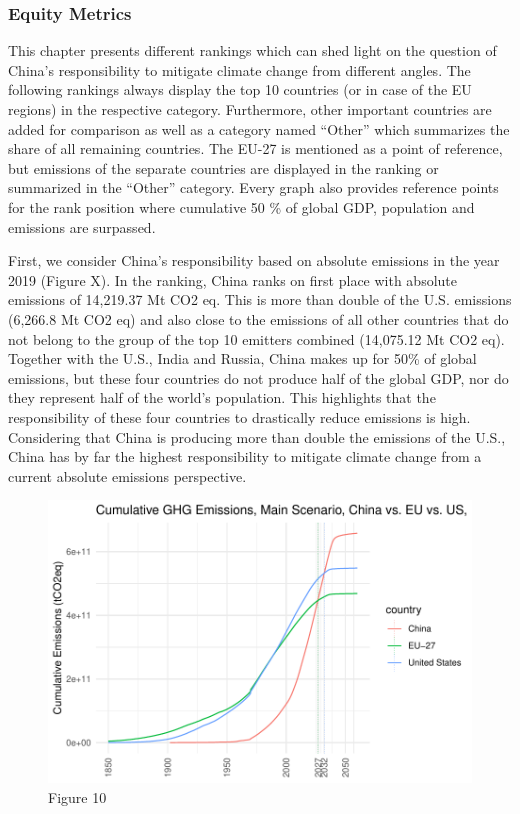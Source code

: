 \documentclass[
  12pt,
]{article}
\numberwithin{equation}{section}
\numberwithin{table}{section}
\numberwithin{figure}{section}
\begin{document}
\hypertarget{equity-metrics}{%
\subsubsection{Equity Metrics}\label{equity-metrics}}

This chapter presents different rankings which can shed light on the
question of China's responsibility to mitigate climate change from
different angles. The following rankings always display the top 10
countries (or in case of the EU regions) in the respective category.
Furthermore, other important countries are added for comparison as well
as a category named ``Other'' which summarizes the share of all
remaining countries. The EU-27 is mentioned as a point of reference, but
emissions of the separate countries are displayed in the ranking or
summarized in the ``Other'' category. Every graph also provides
reference points for the rank position where cumulative 50 \% of global
GDP, population and emissions are surpassed.

First, we consider China's responsibility based on absolute emissions in
the year 2019 (Figure X). In the ranking, China ranks on first place
with absolute emissions of 14,219.37 Mt CO2 eq. This is more than double
of the U.S. emissions (6,266.8 Mt CO2 eq) and also close to the
emissions of all other countries that do not belong to the group of the
top 10 emitters combined (14,075.12 Mt CO2 eq). Together with the U.S.,
India and Russia, China makes up for 50\% of global emissions, but these
four countries do not produce half of the global GDP, nor do they
represent half of the world's population. This highlights that the
responsibility of these four countries to drastically reduce emissions
is high. Considering that China is producing more than double the
emissions of the U.S., China has by far the highest responsibility to
mitigate climate change from a current absolute emissions perspective.

\begin{figure}
\centering
\includegraphics{Paper_files/figure-latex/unnamed-chunk-10-1.pdf}
\caption{Figure 10}
\end{figure}
\end{document}
